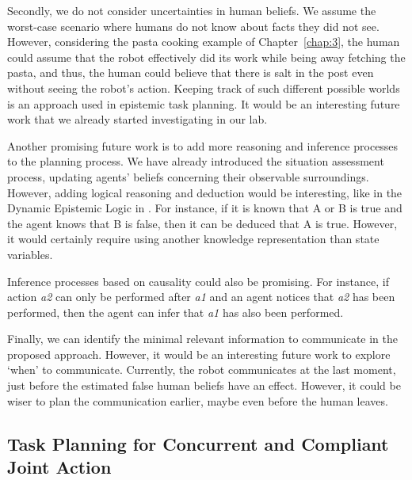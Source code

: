 Secondly, we do not consider uncertainties in human beliefs. We assume the worst-case scenario where humans do not know about facts they did not see. However, considering the pasta cooking example of Chapter~\ref{chap:3}, the human could assume that the robot effectively did its work while being away fetching the pasta, and thus, the human could believe that there is salt in the post even without seeing the robot's action. Keeping track of such different possible worlds is an approach used in epistemic task planning. It would be an interesting future work that we already started investigating in our lab. 

Another promising future work is to add more reasoning and inference processes to the planning process. We have already introduced the situation assessment process, updating agents' beliefs concerning their observable surroundings. However, adding logical reasoning and deduction would be interesting, like in the Dynamic Epistemic Logic in \cite{bolander_gentle_2017}. For instance, if it is known that A or B is true and the agent knows that B is false, then it can be deduced that A is true.
However, it would certainly require using another knowledge representation than state variables.

Inference processes based on causality could also be promising. For instance, if action \textit{a2} can only be performed after \textit{a1} and an agent notices that \textit{a2} has been performed, then the agent can infer that \textit{a1} has also been performed. 

Finally, we can identify the minimal relevant information to communicate in the proposed approach. However, it would be an interesting future work to explore `when' to communicate. Currently, the robot communicates at the last moment, just before the estimated false human beliefs have an effect. However, it could be wiser to plan the communication earlier, maybe even before the human leaves.   

\subsection*{Task Planning for Concurrent and Compliant Joint Action}

